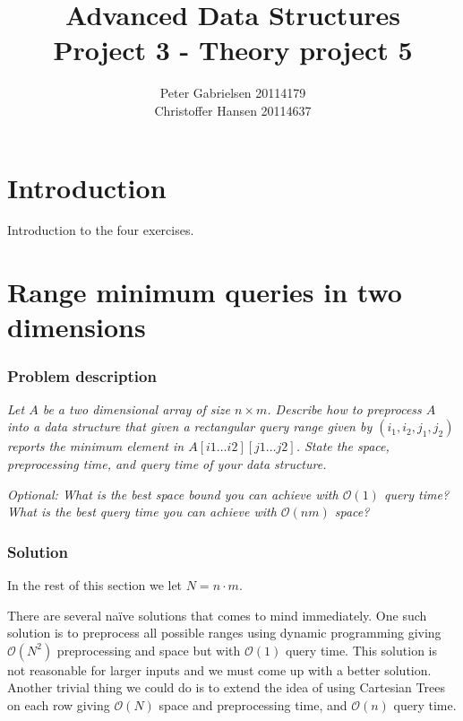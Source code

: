 \documentclass[a4paper,oneside,article,11pt]{memoir}
\title{Advanced Data Structures \\ Project 3 - Theory project 5}
\author{Peter Gabrielsen 20114179 \\
Christoffer Hansen 20114637}
\begin{document}
\begin{titlingpage}
\clearpage

\maketitle
\thispagestyle{empty}

\begin{abstract}

\end{abstract}
\end{titlingpage}

\pagebreak

\tableofcontents

\pagebreak

\chapter{Introduction}
Introduction to the four exercises.

\chapter{Range minimum queries in two dimensions}
\label{chp:rmq2d}
\subsection{Problem description}
\textit{Let $A$ be a two dimensional array of size $n \times m$. Describe how to preprocess $A$ into a data structure that given a rectangular query range given by $(i_1,i_2,j_1,j_2)$ reports the minimum element in $A\left[ i1\dots i2\right]\left[j1\dots j2\right]$. State the space, preprocessing time, and query time of your data structure.}

\textit{Optional: What is the best space bound you can achieve with $\mathcal{O}(1)$ query time? What is the best query time you can achieve with $\mathcal{O}(nm)$ space?}

\subsection{Solution}
In the rest of this section we let $N = n\cdot m$.

There are several naïve solutions that comes to mind immediately. One such solution is to preprocess all possible ranges using dynamic programming giving $\mathcal{O}(N^2)$ preprocessing and space but with $\mathcal{O}(1)$ query time.
This solution is not reasonable for larger inputs and we must come up with a better solution. Another trivial thing we could do is to extend the idea of using Cartesian Trees\cite{vuillemin80,tarjan84} on each row giving $\mathcal{O}(N)$ space and preprocessing time, and $\mathcal{O}(n)$ query time.
\end{document}
